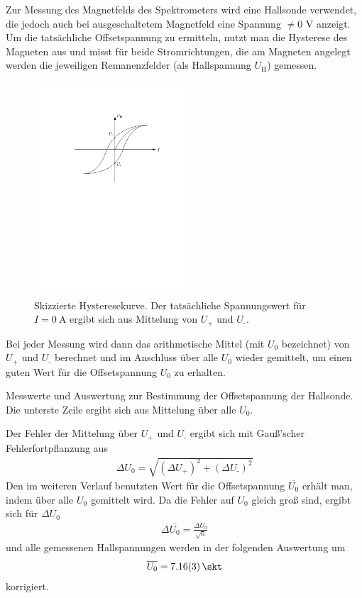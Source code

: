 \documentclass[11pt, a4paper]{article}
\numberwithin{equation}{section}
\begin{document}
Zur Messung des Magnetfelds des Spektrometers wird eine Hallsonde verwendet, die jedoch auch bei ausgeschaltetem Magnetfeld eine Spannung $\neq 0$ \si{\volt} anzeigt.
Um die tatsächliche Offsetspannung zu ermitteln, nutzt man die Hysterese des Magneten aus und misst für beide Stromrichtungen, die am Magneten angelegt werden die jeweiligen Remanenzfelder (als Hallspannung $U_\text{H}$) gemessen.
\begin{figure}[h]
	\centering
	\includegraphics[width=0.5\textwidth]{./figures/hysterese.pdf}
	\caption{Skizzierte Hysteresekurve. Der tatsächliche Spannungswert für $I=\SI{0}{\ampere}$ ergibt sich aus Mittelung von $U_\text{+}$ und $U_\text{-}$.}
	\label{fig:hysterese}
\end{figure}
Bei jeder Messung wird dann das arithmetische Mittel (mit $U_0$ bezeichnet) von $U_\text{+}$ und $U_\text{-}$ berechnet und im Anschluss über alle $U_0$ wieder gemittelt, um einen guten Wert für die Offsetspannung $U_0$ zu erhalten.
\begin{table}[h]
	\centering
	
	\caption{Messwerte und Auswertung zur Bestimmung der Offsetspannung der Hallsonde. Die unterste Zeile ergibt sich aus Mittelung über alle $U_0$.}
	\label{tab:offset}
\end{table}
Der Fehler der Mittelung über $U_\text{+}$ und $U_\text{-}$ ergibt sich mit Gauß'scher Fehlerfortpflanzung aus
\begin{align}
	\Delta U_0 = \sqrt{(\Delta U_\text{+})^2 + (\Delta U_\text{-})^2}
\end{align}
Den im weiteren Verlauf benutzten Wert für die Offsetspannung $\overline{U_0}$ erhält man, indem über alle $U_0$ gemittelt wird. Da die Fehler auf $U_0$ gleich groß sind, ergibt sich für $\Delta\overline{U_0}$
\begin{align}
	\Delta\overline{U_0} = \frac{\Delta U_0}{\sqrt{6}}
\end{align}
und alle gemessenen Hallspannungen werden in der folgenden Auswertung um
\begin{align}
	\overline{U_0} = \SI{7.16 +- 0.03}{\skt}
	\label{hall_korrektur}
\end{align}
korrigiert.
\end{document}
